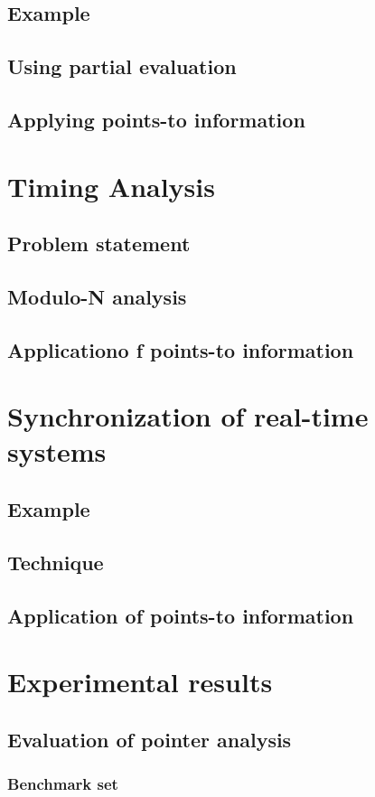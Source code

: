 \documentclass[twoside]{article}
\begin{document}
\subsection{Example}
\subsection{Using partial evaluation}
\subsection{Applying points-to information}
\section{Timing Analysis}
\subsection{Problem statement}
\subsection{Modulo-N analysis}
\subsection{Applicationo f points-to information}
\section{Synchronization of real-time systems}
\subsection{Example}
\subsection{Technique}
\subsection{Application of points-to information}
\section{Experimental results}
\subsection{Evaluation of pointer analysis}
\subsubsection{Benchmark set}
\end{document}
